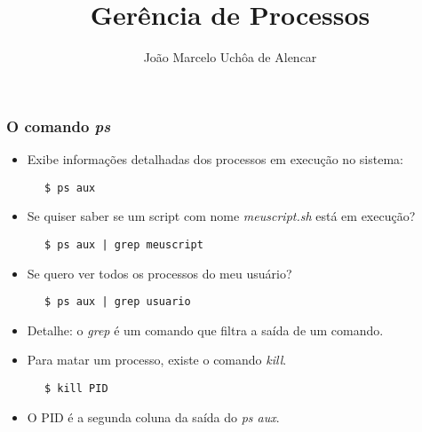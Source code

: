 \documentclass{beamer}
\title{Gerência de Processos}
\author[João Marcelo Uchôa de Alencar]{João Marcelo Uchôa de Alencar}
\institute{Universidade Federal do Ceará - Quixadá}
\begin{document}
   \begin{frame}
      \titlepage
   \end{frame}

   \begin{frame}[fragile]
      \frametitle{O comando \textit{ps}}
      \begin{itemize}
         \item Exibe informações detalhadas dos processos em execução no sistema:
      \end{itemize}
      \begin{verbatim}
      $ ps aux 
      \end{verbatim}
      \begin{itemize}
         \item Se quiser saber se um script com nome \textit{meuscript.sh} está em execução?
      \end{itemize}
      \begin{verbatim}
      $ ps aux | grep meuscript
      \end{verbatim}
      \begin{itemize}
         \item Se quero ver todos os processos do meu usuário?
      \end{itemize}
      \begin{verbatim}
      $ ps aux | grep usuario
      \end{verbatim}
      \begin{itemize}
         \item Detalhe: o \textit{grep} é um comando que filtra a saída de um comando.
         \item Para matar um processo, existe o comando \textit{kill}.
      \end{itemize}
      \begin{verbatim}
      $ kill PID
      \end{verbatim}
      \begin{itemize}
         \item O PID é a segunda coluna da saída do \textit{ps aux}.
      \end{itemize}
\end{frame}
\end{document}

